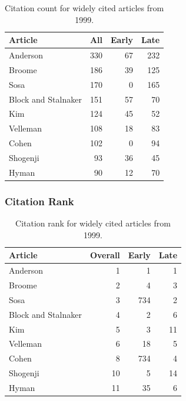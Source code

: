 \documentclass[
  10pt,
  letterpaper,
  DIV=11,
  numbers=noendperiod,
  twoside]{scrartcl}
\begin{document}
\begin{longtable}[]{@{}lrrr@{}}

\caption{\label{tbl-citation-count-1999}Citation count for widely cited
articles from 1999.}

\tabularnewline

\toprule\noalign{}
Article & All & Early & Late \\
\midrule\noalign{}
\endhead
\bottomrule\noalign{}
\endlastfoot
Anderson & 330 & 67 & 232 \\
Broome & 186 & 39 & 125 \\
Sosa & 170 & 0 & 165 \\
Block and Stalnaker & 151 & 57 & 70 \\
Kim & 124 & 45 & 52 \\
Velleman & 108 & 18 & 83 \\
Cohen & 102 & 0 & 94 \\
Shogenji & 93 & 36 & 45 \\
Hyman & 90 & 12 & 70 \\

\end{longtable}

\subsubsection*{Citation Rank}\label{citation-rank-23}

\begin{longtable}[]{@{}lrrr@{}}

\caption{\label{tbl-citation-rank-1999}Citation rank for widely cited
articles from 1999.}

\tabularnewline

\toprule\noalign{}
Article & Overall & Early & Late \\
\midrule\noalign{}
\endhead
\bottomrule\noalign{}
\endlastfoot
Anderson & 1 & 1 & 1 \\
Broome & 2 & 4 & 3 \\
Sosa & 3 & 734 & 2 \\
Block and Stalnaker & 4 & 2 & 6 \\
Kim & 5 & 3 & 11 \\
Velleman & 6 & 18 & 5 \\
Cohen & 8 & 734 & 4 \\
Shogenji & 10 & 5 & 14 \\
Hyman & 11 & 35 & 6 \\

\end{longtable}
\end{document}
